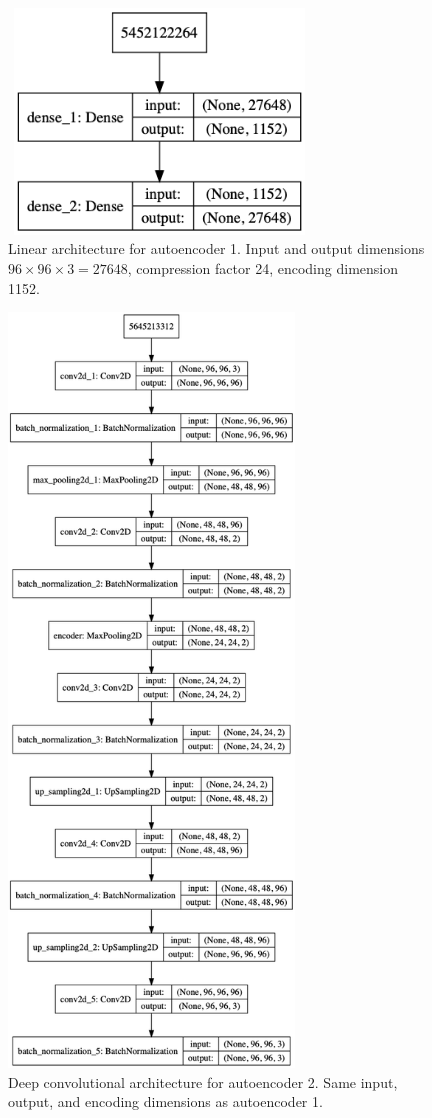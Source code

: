 \begin{figure}[!htbp]
	\begin{center}
		\includegraphics[width=8cm, height=6cm, keepaspectratio]{images/auto_lin_architecture}
		\caption{Linear architecture for autoencoder 1. Input and output dimensions $96\times96\times3 = 27648$, compression factor 24, encoding dimension 1152.}
		\label{fig:auto1}
	\end{center}
\end{figure}

\begin{figure}[!htbp]
	\begin{center}
		\includegraphics[height=20cm, keepaspectratio]{images/auto_conv_architecture}
		\caption{Deep convolutional architecture for autoencoder 2. Same input, output, and encoding dimensions as autoencoder 1.}
		\label{fig:auto2}
	\end{center}
\end{figure}

